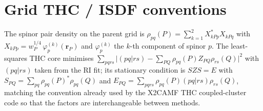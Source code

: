 \documentclass[aip,jcp,amsmath,amssymb,preprint,superscriptaddress]{revtex4-2}%
\newcommand{\rr}{\mathbf{r}}
\begin{document}
\appendix

\section{Grid THC / ISDF conventions}

The spinor pair density on the parent grid is
$\rho_{pq}(P)=\sum_{k=1}^{2}X^{*}_{kPp}X_{kPq}$ with
$X_{kPp}=w_P^{1/4}\,\varphi^{(k)}_{p}(\rr_P)$ and $\varphi^{(k)}_p$ the
$k$-th component of spinor $p$. The least-squares THC core minimises
$\sum_{pqrs}\bigl|(pq|rs)-\sum_{PQ}\rho_{pq}(P)Z_{PQ}\rho_{rs}(Q)\bigr|^2$
with $(pq|rs)$ taken from the RI fit; its stationary condition is
$S Z S = E$ with $S_{PQ}=\sum_{pq}\rho_{pq}(P)^{*}\rho_{pq}(Q)$ and
$E_{PQ}=\sum_{pqrs}\rho_{pq}(P)(pq|rs)\rho_{rs}(Q)$, matching the
convention already used by the X2CAMF THC coupled-cluster code so that the
factors are interchangeable between methods.
\end{document}

